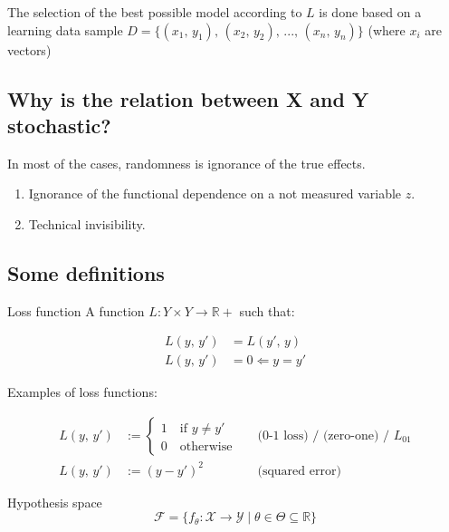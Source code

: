The selection of the best possible model according to \(L\) is done
based on a learning data sample
\(D = \bigl\{(x_1,\, y_1),\, (x_2,\, y_2),\, ...,\, (x_n,\, y_n)\bigr\}\) (where \(x_i\) are
vectors)

\subsection{Why is the relation between X and Y stochastic?}

In most of the cases, randomness is ignorance of the true effects.
\begin{enumerate}
	\item
	      Ignorance of the functional dependence on a not measured variable
	      \(z\).
	\item
	      Technical invisibility.
\end{enumerate}

\subsection{Some definitions}

\begin{definition}{Loss function}{}
	A function
	\(L: Y \times Y \longrightarrow \mathds{R}+\) such that:

	\begin{align*}
		L(y,\, y') & = L(y',\, y) \tag{symmetry} \\
		L(y,\, y') & = 0  \Longleftarrow y = y'
	\end{align*}

	Examples of loss functions:

	\begin{align*}
		L(y,\, y') & := \begin{cases}1 \quad \text{if } y \neq y' \\ 0 \quad \text{otherwise} \end{cases} &  & \text{(0-1 loss) / (zero-one) / } L_{01} \\
		L(y,\, y') & := (y - y')^2                                                                        &  & \text{(squared error)}
	\end{align*}
\end{definition}

\begin{definition}{Hypothesis space}{}
	\begin{equation*}
		\mathcal{F} = \bigl\{f_\theta: \mathcal{X} \rightarrow \mathcal{Y} \mid \theta \in \varTheta \subseteq \mathds{R} \bigr\}
	\end{equation*}
\end{definition}


